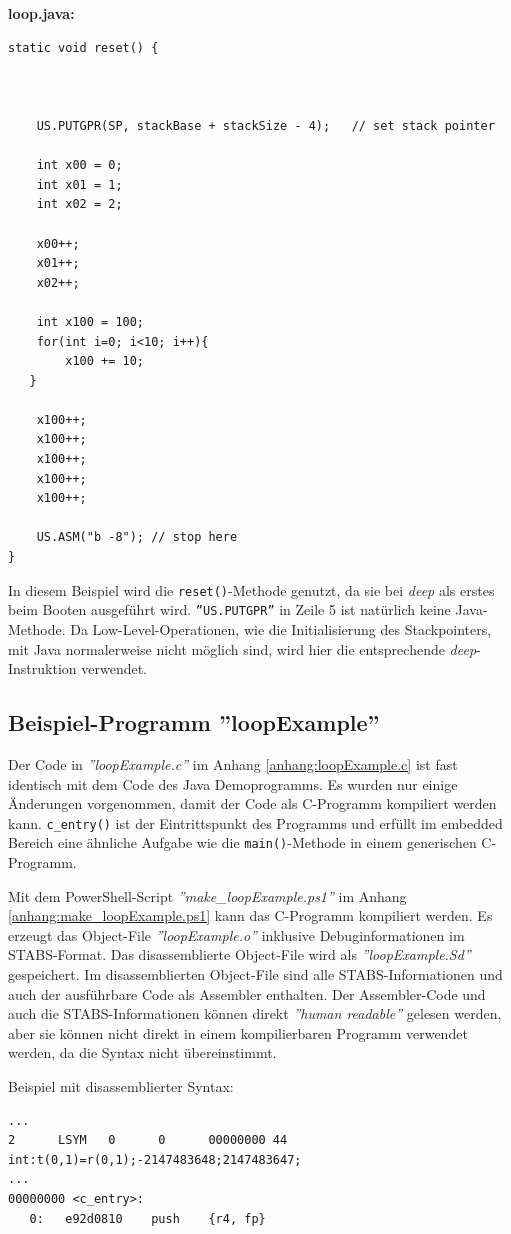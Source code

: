 \textbf{loop.java:}
\lstset{language=java}
\begin{lstlisting}
static void reset() {



	US.PUTGPR(SP, stackBase + stackSize - 4);	// set stack pointer
	
	int x00 = 0;
	int x01 = 1;
	int x02 = 2;
	
	x00++;
	x01++;
	x02++;
	
	int x100 = 100;
	for(int i=0; i<10; i++){
		x100 += 10;
   }
		
	x100++;
	x100++;
	x100++;
	x100++;
	x100++;

	US.ASM("b -8"); // stop here
}
\end{lstlisting}

In diesem Beispiel wird die \texttt{reset()}-Methode genutzt, da sie bei \textit{deep} als erstes beim Booten ausgeführt wird.
\texttt{''US.PUTGPR''} in Zeile 5 ist natürlich keine Java-Methode.
Da Low-Level-Operationen, wie die Initialisierung des Stackpointers, mit Java normalerweise nicht möglich sind, wird hier die entsprechende \textit{deep}-Instruktion verwendet.


\subsection{Beispiel-Programm ''loopExample''}
Der Code in \textit{''loopExample.c''} im Anhang \ref{anhang:loopExample.c} ist fast identisch mit dem Code des Java Demoprogramms.
Es wurden nur einige Änderungen vorgenommen, damit der Code als C-Programm kompiliert werden kann.
\texttt{c\_entry()} ist der Eintrittspunkt des Programms und erfüllt im embedded Bereich eine ähnliche Aufgabe wie die  \texttt{main()}-Methode in einem generischen C-Programm.

Mit dem PowerShell-Script \textit{''make\_loopExample.ps1''} im Anhang \ref{anhang:make_loopExample.ps1} kann das C-Programm kompiliert werden.
Es erzeugt das Object-File \textit{''loopExample.o''} inklusive Debuginformationen im STABS-Format.
Das disassemblierte Object-File wird als \textit{''loopExample.Sd''} gespeichert.
Im disassemblierten Object-File sind alle STABS-Informationen und auch der ausführbare Code als Assembler enthalten.
Der Assembler-Code und auch die STABS-Informationen können direkt \textit{''human readable''} gelesen werden, aber sie können nicht direkt in einem kompilierbaren Programm verwendet werden, da die Syntax nicht übereinstimmt.

Beispiel mit disassemblierter Syntax:
\lstset{language=plain}
\begin{lstlisting}
...
2      LSYM   0      0      00000000 44     int:t(0,1)=r(0,1);-2147483648;2147483647;
...
00000000 <c_entry>:
   0:	e92d0810 	push	{r4, fp}
\end{lstlisting}


